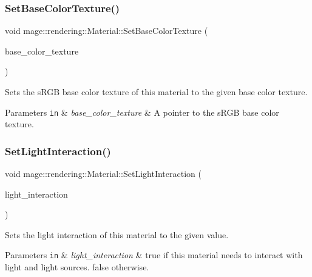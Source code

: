 \subsubsection{\texorpdfstring{Set\+Base\+Color\+Texture()}{SetBaseColorTexture()}}
{\footnotesize\ttfamily void mage\+::rendering\+::\+Material\+::\+Set\+Base\+Color\+Texture (\begin{DoxyParamCaption}\item[{\hyperlink{namespacemage_1_1rendering_a6f3ae54f825328465b0cdde0f0de4a36}{Texture\+Ptr}}]{base\+\_\+color\+\_\+texture }\end{DoxyParamCaption})\hspace{0.3cm}{\ttfamily [noexcept]}}

Sets the s\+R\+GB base color texture of this material to the given base color texture.


\begin{DoxyParams}[1]{Parameters}
\mbox{\tt in}  & {\em base\+\_\+color\+\_\+texture} & A pointer to the s\+R\+GB base color texture. \\
\hline
\end{DoxyParams}
\hypertarget{classmage_1_1rendering_1_1_material_a151a2170aa88811ea6fb1537ce68803d}{}\label{classmage_1_1rendering_1_1_material_a151a2170aa88811ea6fb1537ce68803d} 
\subsubsection{\texorpdfstring{Set\+Light\+Interaction()}{SetLightInteraction()}}
{\footnotesize\ttfamily void mage\+::rendering\+::\+Material\+::\+Set\+Light\+Interaction (\begin{DoxyParamCaption}\item[{bool}]{light\+\_\+interaction }\end{DoxyParamCaption})\hspace{0.3cm}{\ttfamily [noexcept]}}

Sets the light interaction of this material to the given value.


\begin{DoxyParams}[1]{Parameters}
\mbox{\tt in}  & {\em light\+\_\+interaction} & {\ttfamily true} if this material needs to interact with light and light sources. {\ttfamily false} otherwise. \\
\hline
\end{DoxyParams}
\hypertarget{classmage_1_1rendering_1_1_material_a6bf886a16cbe84c55664701ab3a82658}{}\label{classmage_1_1rendering_1_1_material_a6bf886a16cbe84c55664701ab3a82658} 
